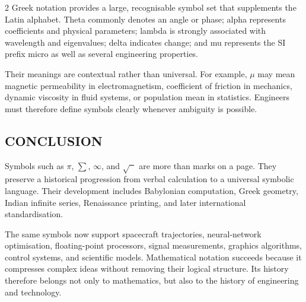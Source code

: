 \begin{multicols}{2}
  Greek notation provides a large, recognisable symbol set that supplements the Latin alphabet. Theta commonly denotes an angle or phase; alpha represents coefficients and physical parameters; lambda is strongly associated with wavelength and eigenvalues; delta indicates change; and mu represents the SI prefix micro as well as several engineering properties.

  \noindent
  Their meanings are contextual rather than universal. For example, $\mu$ may mean magnetic permeability in electromagnetism, coefficient of friction in mechanics, dynamic viscosity in fluid systems, or population mean in statistics. Engineers must therefore define symbols clearly whenever ambiguity is possible.

  \subsection*{\centering\uppercase{Conclusion}}
  Symbols such as $\pi$, $\sum$, $\infty$, and $\sqrt{\phantom{x}}$ are more than marks on a page. They preserve a historical progression from verbal calculation to a universal symbolic language. Their development includes Babylonian computation, Greek geometry, Indian infinite series, Renaissance printing, and later international standardisation.

  \noindent
  The same symbols now support spacecraft trajectories, neural-network optimisation, floating-point processors, signal measurements, graphics algorithms, control systems, and scientific models. Mathematical notation succeeds because it compresses complex ideas without removing their logical structure. Its history therefore belongs not only to mathematics, but also to the history of engineering and technology.


\end{multicols}
